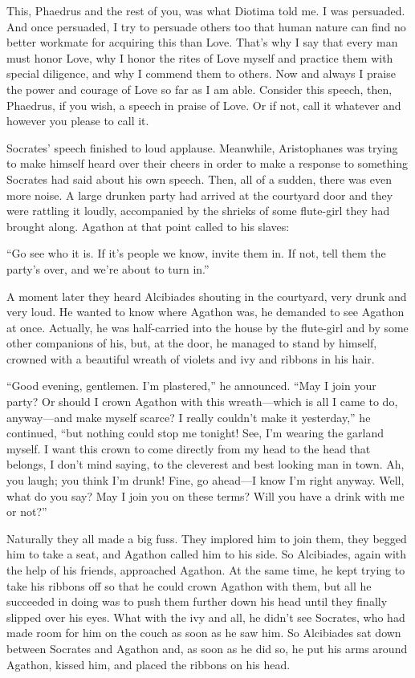 This, Phaedrus and the rest of you, was what Diotima told me. I was
persuaded. And once persuaded, I try to persuade others too that human
nature can find no better workmate for acquiring this than Love. That's
why I say that every man must honor Love, why I honor the rites of Love
myself and practice them with special diligence, and why I commend them
to others. Now and always I praise the power and courage of Love so far
 as I am able. Consider this speech, then, Phaedrus, if you wish,
a speech in praise of Love. Or if not, call it whatever and however you
please to call it.

\blank[line]

Socrates' speech finished to loud applause. Meanwhile, Aristophanes was
trying to make himself heard over their cheers in order to make a
response to something Socrates had said about his own
speech. Then, all of
a sudden, there was even more noise. A large drunken party had arrived
at the courtyard door and they were rattling it loudly, accompanied by
the shrieks of some flute-girl they had brought along. Agathon at that
point called to his slaves:

 “Go see who it is. If it's people we know, invite them in. If
not, tell them the party's over, and we're about to turn in.”

A moment later they heard Alcibiades shouting in the courtyard, very
drunk and very loud. He wanted to know where Agathon was, he demanded to
see Agathon at once. Actually, he was half-carried into the 
house by the flute-girl and by some other companions of his, but, at the
door, he managed to stand by himself, crowned with a beautiful wreath of
violets and ivy and ribbons in his hair.

“Good evening, gentlemen. I'm plastered,” he announced. “May I join your
party? Or should I crown Agathon with this wreath---which is all I came
to do, anyway---and make myself scarce? I really couldn't make it
yesterday,” he continued, “but nothing could stop me tonight! See, I'm
wearing the garland myself. I want this crown to come directly from my
head to the head that belongs, I don't mind saying, to the cleverest and
best looking man in town. Ah, you laugh; you think I'm drunk! Fine, go
 ahead---I know I'm right anyway. Well, what do you say?
May I join you on these terms? Will you have a drink with me or not?”

Naturally they all made a big fuss. They implored him to join them, they
begged him to take a seat, and Agathon called him to his side. So
Alcibiades, again with the help of his friends, approached Agathon. At
the same time, he kept trying to take his ribbons off so that he could
crown Agathon with them, but all he succeeded in doing was to push them
further down his head until they finally slipped over his eyes. What
with the ivy and all, he didn't see Socrates, who had made room for him
on the couch as soon as he saw him. So Alcibiades sat down between
Socrates  and Agathon and, as soon as he did so, he put his arms
around Agathon, kissed him, and placed the ribbons on his head.

